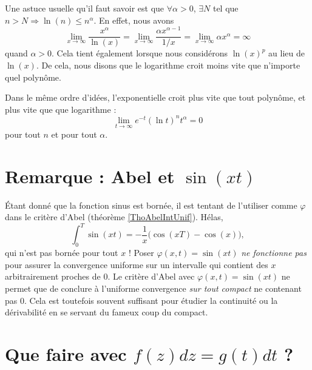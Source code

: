 Une astuce\label{PgAstuceLnPoly} usuelle qu'il faut savoir est que $\forall \alpha>0$, $\exists N$ tel que $n>N\Rightarrow \ln(n)\leq n^{\alpha}$. En effet, nous avons
\begin{equation}
    \lim_{x\to\infty} \frac{ x^{\alpha} }{ \ln(x) }=\lim_{x\to\infty} \frac{ \alpha x^{\alpha-1} }{ 1/x }=\lim_{x\to\infty} \alpha x^{\alpha}=\infty
\end{equation}
quand $\alpha>0$. Cela tient également lorsque nous considérons $\ln(x)^p$ au lieu de $\ln(x)$. De cela, nous disons que le logarithme croit moins vite que n'importe quel polynôme. 

Dans le même ordre d'idées, l'exponentielle croit plus vite que tout polynôme, et plus vite que que logarithme :
\begin{equation}        \label{EqExpDecrtPlusVite}
    \lim_{t\to\infty} e^{-t}(\ln t)^{n}t^{\alpha}=0
\end{equation}
pour tout $n$ et pour tout $\alpha$.

\section{Remarque : Abel et \texorpdfstring{$\sin(xt)$}{sin(xt)}}

Étant donné que la fonction sinus est bornée, il est tentant de l'utiliser comme $\varphi$ dans le critère d'Abel (théorème \ref{ThoAbelIntUnif}). Hélas,
\begin{equation}
    \int_0^T\sin(xt)=-\frac{ 1 }{ x }\big( \cos(xT)-\cos(x) \big),
\end{equation}
qui n'est pas bornée pour tout $x$ ! Poser $\varphi(x,t)=\sin(xt)$ \emph{ne fonctionne pas} pour assurer la convergence uniforme sur un intervalle qui contient des $x$ arbitrairement proches de $0$. Le critère d'Abel avec $\varphi(x,t)=\sin(xt)$ ne permet que de conclure à l'uniforme convergence \emph{sur tout compact} ne contenant pas $0$. Cela est toutefois souvent suffisant pour étudier la continuité ou la dérivabilité en se servant du fameux coup du compact.

                    \section{Que faire avec \texorpdfstring{$f(z)dz=g(t)dt$}{fzdz} ?}
\label{SecFairedzdt}

